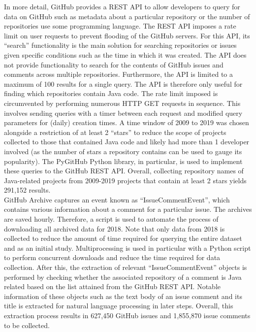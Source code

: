 In more detail, GitHub provides a REST API to allow developers to query for data on GitHub such as metadata about a particular repository or the number of repositories use some programming language. The REST API imposes a rate limit on user requests to prevent flooding of the GitHub servers. For this API, its  ``search'' functionality is the main solution for searching repositories or issues given specific conditions such as the time in which it was created. The API does not provide functionality to search for the contents of GitHub issues and comments across multiple repositories. Furthermore, the API is limited to a maximum of 100 results for a single query. The API is therefore only useful for finding which repositories contain Java code. The rate limit imposed is circumvented by performing numerous HTTP GET requests in sequence. This involves sending queries with a timer between each request and modified query parameters for (daily) creation times. A time window of 2009 to 2019 was chosen alongside a restriction of at least 2 ``stars'' to reduce the scope of projects collected to those that contained Java code and likely had more than 1 developer involved (as the number of stars a repository contains can be used to gauge its popularity). The PyGitHub Python library, in particular, is used to implement these queries to the GitHub REST API. Overall, collecting repository names of Java-related projects from 2009-2019 projects that contain at least 2 stars yields 291,152 results. \\

GitHub Archive captures an event known as ``IssueCommentEvent'', which contains various information about a comment for a particular issue. The archives are saved hourly. Therefore, a script is used to automate the process of downloading all archived data for 2018. Note that only data from 2018 is collected to reduce the amount of time required for querying the entire dataset and as an initial study. Multiprocessing is used in particular with a Python script to perform concurrent downloads and reduce the time required for data collection. After this, the extraction of relevant ``IssueCommentEvent'' objects is performed by checking whether the associated repository of a comment is Java related based on the list attained from the GitHub REST API. Notable information of these objects such as the text body of an issue comment and its title is extracted for natural language processing in later steps. Overall, this extraction process results in 627,450 GitHub issues and 1,855,870 issue comments to be collected.

